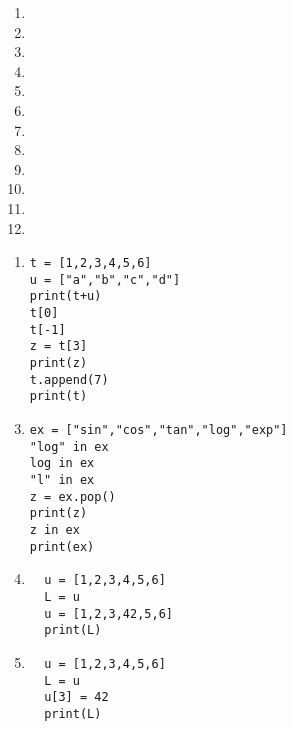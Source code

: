 \begin{multicols}{3}
  \begin{enumerate}[label=\emph{\alph*)}]
    \item \pyv{[1,2,3,"a"]}
    \item {}
    \item \pyv{[]}
    \item \pyv{[]+[]}
    \item \pyv{[]+[] == []}
    \item \pyv{[1,2] + [5,7,9]}
    \item \pyv{[0,0]+[0]}
    \item {}
    \item {}
    \item {}
    \item {}
    \item {}
  \end{enumerate}
\end{multicols}


\begin{enumerate}[label=\emph{\alph*)}]
\item 
\begin{lstlisting}
t = [1,2,3,4,5,6]
u = ["a","b","c","d"]
print(t+u)
t[0]
t[-1]
z = t[3]
print(z)
t.append(7)
print(t)
\end{lstlisting}
\end{enumerate}
\begin{enumerate}[label=\emph{\alph*)}]
\setcounter{enumi}{2}
\item
\begin{lstlisting}
ex = ["sin","cos","tan","log","exp"]
"log" in ex
log in ex
"l" in ex
z = ex.pop()
print(z)
z in ex
print(ex)
\end{lstlisting}
\end{enumerate}
\begin{enumerate}[label=\emph{\alph*)}]
\setcounter{enumi}{3}
\item 
\begin{lstlisting}
  u = [1,2,3,4,5,6]
  L = u
  u = [1,2,3,42,5,6]
  print(L)
\end{lstlisting}
\end{enumerate}
\begin{enumerate}[label=\emph{\alph*)}]
\setcounter{enumi}{4}
\item
\begin{lstlisting}
  u = [1,2,3,4,5,6]
  L = u
  u[3] = 42
  print(L)
\end{lstlisting}
\end{enumerate}


